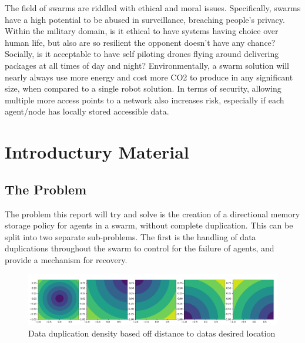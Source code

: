 \documentclass{UoYCSproject}
\begin{document}
\begin{summary}

The field of swarms are riddled with ethical and moral issues. Specifically, swarms have a high potential to be abused in surveillance, breaching people's privacy. Within the military domain, is it ethical to have systems having choice over human life, but also are so resilient the opponent doesn’t have any chance? Socially, is it acceptable to have self piloting drones flying around delivering packages at all times of day and night? Environmentally, a swarm solution will nearly always use more energy and cost more CO2 to produce in any significant size, when compared to a single robot solution. In terms of security, allowing multiple more access points to a network also increases risk, especially if each agent/node has locally stored accessible data.

\end{summary}




\chapter{Introductury Material}
\label{cha:Introductury Material}

\section{The Problem}
\label{sec:Problem}

The problem this report will try and solve is the creation of a directional memory storage policy for agents in a swarm, without complete duplication. 
This can be split into two separate sub-problems.
The first is the handling of data duplications throughout the swarm to control for the failure of agents, and provide a mechanism for recovery.

\begin{figure}[htb]
\label{fig:popdensity}
\begin{center}
\centering
\includegraphics[width=\linewidth]{"./ExplanationImgs/Memory_Pop_Density.png"}
\caption{Data duplication density based off distance to datas desired location}
\end{center}
\end{figure}
\end{document}
